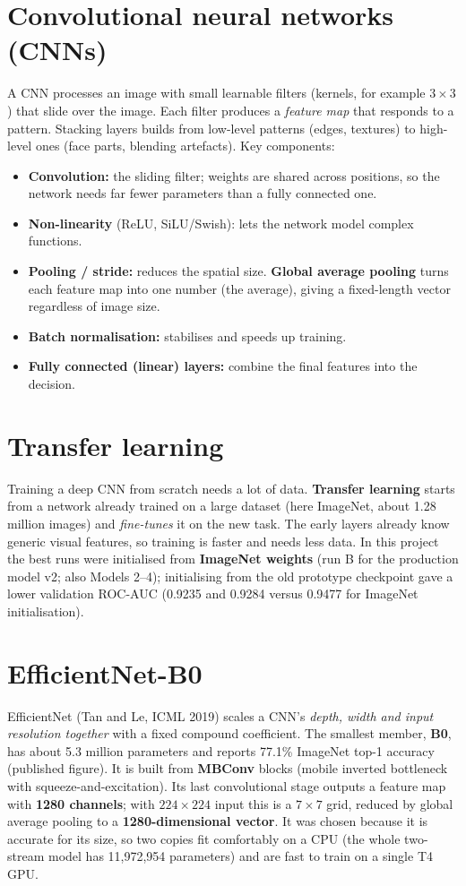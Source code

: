 \documentclass[11pt,a4paper]{report}
\begin{document}
\section{Convolutional neural networks (CNNs)}
A CNN processes an image with small learnable filters (kernels, for example $3\times3$) that slide over the image. Each filter produces a \emph{feature map} that responds to a pattern. Stacking layers builds from low-level patterns (edges, textures) to high-level ones (face parts, blending artefacts).
Key components:
\begin{itemize}
\item \textbf{Convolution:} the sliding filter; weights are shared across positions, so the network needs far fewer parameters than a fully connected one.
\item \textbf{Non-linearity} (ReLU, SiLU/Swish): lets the network model complex functions.
\item \textbf{Pooling / stride:} reduces the spatial size. \textbf{Global average pooling} turns each feature map into one number (the average), giving a fixed-length vector regardless of image size.
\item \textbf{Batch normalisation:} stabilises and speeds up training.
\item \textbf{Fully connected (linear) layers:} combine the final features into the decision.
\end{itemize}

\section{Transfer learning}
Training a deep CNN from scratch needs a lot of data. \textbf{Transfer learning} starts from a network already trained on a large dataset (here ImageNet, about 1.28 million images) and \emph{fine-tunes} it on the new task.
The early layers already know generic visual features, so training is faster and needs less data. In this project the best runs were initialised from \textbf{ImageNet weights} (run B for the production model v2; also Models 2--4);
initialising from the old prototype checkpoint gave a lower validation ROC-AUC (0.9235 and 0.9284 versus 0.9477 for ImageNet initialisation).

\section{EfficientNet-B0}
EfficientNet (Tan and Le, ICML 2019) scales a CNN's \emph{depth, width and input resolution together} with a fixed compound coefficient. The smallest member, \textbf{B0}, has about 5.3 million parameters and reports 77.1\% ImageNet top-1 accuracy (published figure).
It is built from \textbf{MBConv} blocks (mobile inverted bottleneck with squeeze-and-excitation). Its last convolutional stage outputs a feature map with \textbf{1280 channels}; with $224\times224$ input this is a $7\times7$ grid, reduced by global average pooling to a \textbf{1280-dimensional vector}.
It was chosen because it is accurate for its size, so two copies fit comfortably on a CPU (the whole two-stream model has 11,972,954 parameters) and are fast to train on a single T4 GPU.
\end{document}
